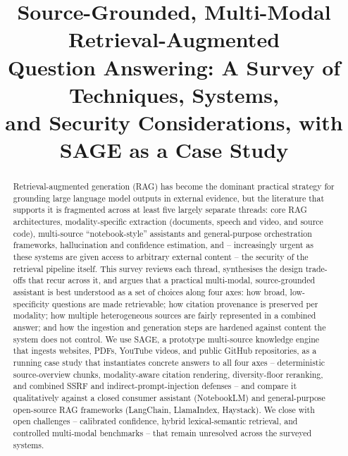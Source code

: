 \documentclass[conference]{IEEEtran}
\begin{document}
\title{Source-Grounded, Multi-Modal Retrieval-Augmented\\
Question Answering: A Survey of Techniques, Systems,\\
and Security Considerations, with SAGE as a Case Study}

\author{
}

\maketitle

\begin{abstract}
Retrieval-augmented generation (RAG) has become the dominant practical
strategy for grounding large language model outputs in external
evidence, but the literature that supports it is fragmented across at
least five largely separate threads: core RAG architectures, modality-specific
extraction (documents, speech and video, and source code), multi-source
``notebook-style'' assistants and general-purpose orchestration
frameworks, hallucination and confidence estimation, and -- increasingly
urgent as these systems are given access to arbitrary external content --
the security of the retrieval pipeline itself. This survey reviews each
thread, synthesises the design trade-offs that recur across it, and
argues that a practical multi-modal, source-grounded assistant is best
understood as a set of choices along four axes: how broad, low-specificity
questions are made retrievable; how citation provenance is preserved
per modality; how multiple heterogeneous sources are fairly represented
in a combined answer; and how the ingestion and generation steps are
hardened against content the system does not control. We use SAGE, a
prototype multi-source knowledge engine that ingests websites, PDFs,
YouTube videos, and public GitHub repositories, as a running case study
that instantiates concrete answers to all four axes -- deterministic
source-overview chunks, modality-aware citation rendering, diversity-floor
reranking, and combined SSRF and indirect-prompt-injection defenses --
and compare it qualitatively against a closed consumer assistant
(NotebookLM) and general-purpose open-source RAG frameworks (LangChain,
LlamaIndex, Haystack). We close with open challenges -- calibrated
confidence, hybrid lexical-semantic retrieval, and controlled multi-modal
benchmarks -- that remain unresolved across the surveyed systems.
\end{abstract}
\end{document}
